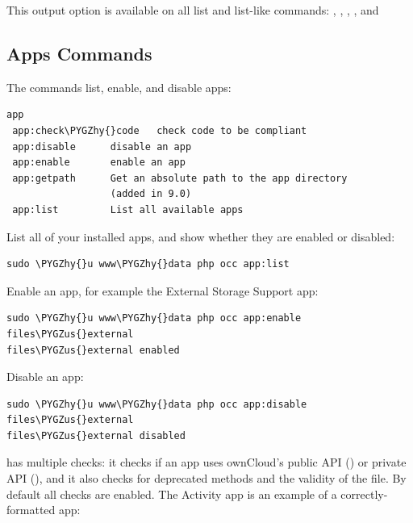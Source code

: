 \documentclass[letterpaper,10pt,english]{sphinxmanual}
\def\PYGZus{\char`\_}
\def\PYGZhy{\char`\-}
\begin{document}
This output option is available on all list and list-like commands:
, , , , 
and 


\subsection{Apps Commands}
\label{configuration_server/occ_command:apps-commands-label}\label{configuration_server/occ_command:apps-commands}
The  commands list, enable, and disable apps:

\begin{Verbatim}[commandchars=\\\{\}]
app
 app:check\PYGZhy{}code   check code to be compliant
 app:disable      disable an app
 app:enable       enable an app
 app:getpath      Get an absolute path to the app directory
                  (added in 9.0)
 app:list         List all available apps
\end{Verbatim}

List all of your installed apps, and show whether they are
enabled or disabled:

\begin{Verbatim}[commandchars=\\\{\}]
sudo \PYGZhy{}u www\PYGZhy{}data php occ app:list
\end{Verbatim}

Enable an app, for example the External Storage Support app:

\begin{Verbatim}[commandchars=\\\{\}]
sudo \PYGZhy{}u www\PYGZhy{}data php occ app:enable files\PYGZus{}external
files\PYGZus{}external enabled
\end{Verbatim}

Disable an app:

\begin{Verbatim}[commandchars=\\\{\}]
sudo \PYGZhy{}u www\PYGZhy{}data php occ app:disable files\PYGZus{}external
files\PYGZus{}external disabled
\end{Verbatim}

 has multiple checks: it checks if an app uses ownCloud's
public API () or private API (), and it also checks for deprecated
methods and the validity of the  file. By default all checks are
enabled. The Activity app is an example of a correctly-formatted app:
\end{document}
